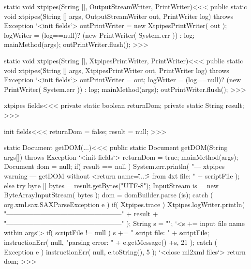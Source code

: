 \documentclass{article}
\begin{document}
{\<static void xtpipes(String [], OutputStreamWriter, PrintWriter)\><<<
public static void xtpipes(String [] args,
                           OutputStreamWriter out,
                           PrintWriter log)
                                                throws Exception {
  `<init fields`>
  outPrintWriter = new XtpipesPrintWriter( out );
  logWriter = (log==null)? (new PrintWriter( System.err )) : log;
  mainMethod(args);
  outPrintWriter.flush();
}
>>>

\<static void xtpipes(String [], XtpipesPrintWriter, PrintWriter)\><<<
public static void xtpipes(String [] args,
                           XtpipesPrintWriter out,
                           PrintWriter log)
                                                throws Exception {
  `<init fields`>
  outPrintWriter = out;
  logWriter = (log==null)? (new PrintWriter( System.err )) : log;
  mainMethod(args);
  outPrintWriter.flush();
}
>>>


\<xtpipes fields\><<<
private static boolean returnDom;
private static String result;
>>>

\<init fields\><<<
returnDom = false;
result = null;
>>>


\<static Document getDOM(...)\><<<
public static Document getDOM(String args[])
                               throws Exception {
  `<init fields`>
   returnDom = true;
   mainMethod(args);
   Document dom = null;
   if( result == null ){
     System.err.println(
       "--- xtpipes warning --- getDOM without <return name=\"...\"> from 4xt file: "
         + scriptFile );
   } else {
      try{
         byte [] bytes = result.getBytes("UTF-8");
         InputStream is =  new ByteArrayInputStream( bytes );
         dom = domBuilder.parse (is);
      } catch ( org.xml.sax.SAXParseException e ){
         if( Xtpipes.trace ){
            Xtpipes.logWriter.println(
               "\n---------------------------------------------------\n"
                        + result +
               "\n---------------------------------------------------\n" );
         }
         String s = "";
         `<s += input file name within args`>
         if( scriptFile != null ){ s += "    script file: " + scriptFile; }
         instructionErr( null,
            "parsing error: " + e.getMessage() +s, 21 );
      } catch ( Exception e ){
         instructionErr( null, e.toString(), 5 );
      }
      `<close ml2xml files`>
   }
   return dom;
}
>>>

}
\end{document}
